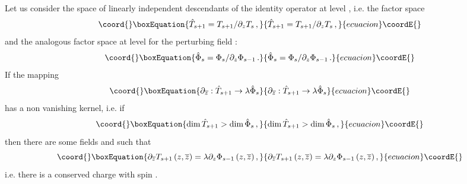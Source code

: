 \documentclass[a4paper,12pt]{report}
\begin{document}
Let us consider the space of linearly independent descendants of the identity operator at level \coordHE{}, i.e. the
factor space
\begin{equation}\coord{}\boxEquation{
\hat{T}_{s+1}=T_{s+1}/\partial_{z}T_{s}\,,
}{
\hat{T}_{s+1}=T_{s+1}/\partial_{z}T_{s}\,,
}{ecuacion}\coordE{}\end{equation}
and the analogous factor space at level \coordHE{} for the perturbing field \myHighlight{$\Phi$}\coordHE{}:
\begin{equation}\coord{}\boxEquation{
\hat{\Phi}_{s}=\Phi_{s}/\partial_{z}\Phi_{s-1}\,.
}{
\hat{\Phi}_{s}=\Phi_{s}/\partial_{z}\Phi_{s-1}\,.
}{ecuacion}\coordE{}\end{equation}
If the mapping
\begin{equation}\coord{}\boxEquation{
\partial_{\overline{z}}:\hat{T}_{s+1}\rightarrow\lambda \hat{\Phi}_{s}
}{
\partial_{\overline{z}}:\hat{T}_{s+1}\rightarrow\lambda \hat{\Phi}_{s}
}{ecuacion}\coordE{}\end{equation}
has a non vanishing kernel, i.e. if
\begin{equation}\coord{}\boxEquation{\label{countdim}
\textrm{dim}\,\hat{T}_{s+1}>\textrm{dim}\, \hat{\Phi}_{s}\,,
}{\textrm{dim}\,\hat{T}_{s+1}>\textrm{dim}\, \hat{\Phi}_{s}\,,
}{ecuacion}\coordE{}\end{equation}
then there are some fields \coordHE{} and
\coordHE{} such that
\begin{equation}\coord{}\boxEquation{
\partial_{\overline{z}}T_{s+1}\left(z,\overline{z}\right)=\lambda
\partial_{z}\Phi_{s-1}\left(z,\overline{z}\right),
}{
\partial_{\overline{z}}T_{s+1}\left(z,\overline{z}\right)=\lambda
\partial_{z}\Phi_{s-1}\left(z,\overline{z}\right),
}{ecuacion}\coordE{}\end{equation}
i.e. there is a conserved charge with spin \coordHE{}.
\end{document}

